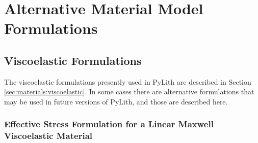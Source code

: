 
\chapter{\label{cha:materials:alternative:formulations}Alternative Material Model Formulations}


\section{\label{sec:materials:formulations:viscoelastic}Viscoelastic Formulations}

The viscoelastic formulations presently used in PyLith are described
in Section \vref{sec:materials:viscoelastic}. In some cases there
are alternative formulations that may be used in future versions of
PyLith, and those are described here.


\subsection{\label{sub:Effective-Stress-Formulation-Maxwell}Effective Stress
Formulation for a Linear Maxwell Viscoelastic Material}

